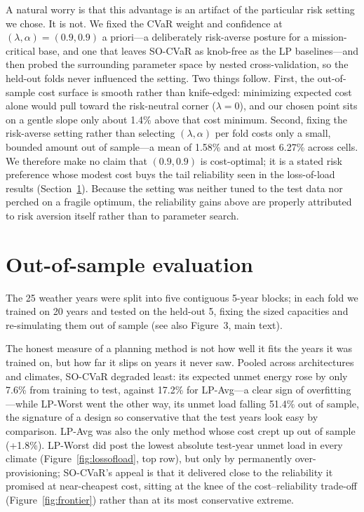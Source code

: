 \documentclass[11pt]{article}
\begin{document}
A natural worry is that this advantage is an artifact of the particular risk setting we chose. It is
not. We fixed the CVaR weight and confidence at $(\lambda,\alpha)=(0.9,0.9)$ a priori---a
deliberately risk-averse posture for a mission-critical base, and one that leaves SO-CVaR as
knob-free as the LP baselines---and then probed the surrounding parameter space by nested
cross-validation, so the held-out folds never influenced the setting. Two things follow. First, the
out-of-sample cost surface is smooth rather than knife-edged: minimizing expected cost alone would
pull toward the risk-neutral corner ($\lambda = 0$), and our chosen point sits on a gentle slope
only about 1.4\% above that cost minimum. Second, fixing the risk-averse setting rather than
selecting $(\lambda,\alpha)$ per fold costs only a small, bounded amount out of sample---a mean of
1.58\% and at most 6.27\% across cells. We therefore make no claim that $(0.9,0.9)$ is cost-optimal;
it is a stated risk preference whose modest cost buys the tail reliability seen in the loss-of-load
results (Section~\ref{sec:oos}). Because the setting was neither tuned to the test data nor perched on a fragile optimum, the
reliability gains above are properly attributed to risk aversion itself rather than to parameter
search.

\section{Out-of-sample evaluation}\label{sec:oos}
The 25 weather years were split into five contiguous 5-year blocks; in each fold we trained on 20
years and tested on the held-out 5, fixing the sized capacities and re-simulating them out of sample
(see also Figure~3, main text).

The honest measure of a planning method is not how well it fits the years it was trained on, but how
far it slips on years it never saw. Pooled across architectures and climates, SO-CVaR degraded
least: its expected unmet energy rose by only 7.6\% from training to test, against 17.2\% for
LP-Avg---a clear sign of overfitting---while LP-Worst went the other way, its unmet load falling
51.4\% out of sample, the signature of a design so conservative that the test years look easy by
comparison. LP-Avg was also the only method whose cost crept up out of sample (+1.8\%). LP-Worst did
post the lowest absolute test-year unmet load in every climate (Figure~\ref{fig:lossofload}, top
row), but only by permanently over-provisioning; SO-CVaR's appeal is that it delivered close to the
reliability it promised at near-cheapest cost, sitting at the knee of the cost--reliability
trade-off (Figure~\ref{fig:frontier}) rather than at its most conservative extreme.
\end{document}
